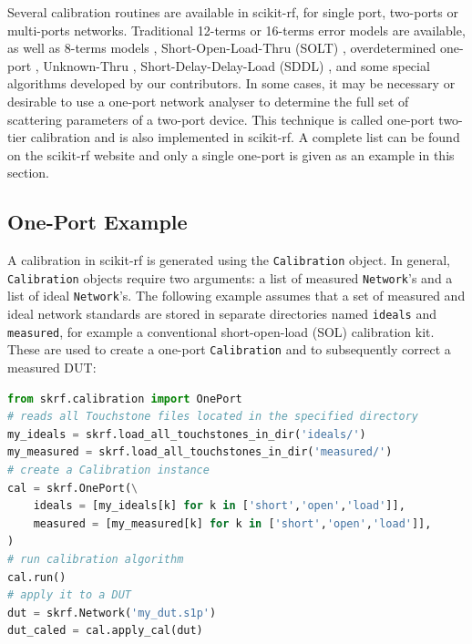\documentclass[10pt, letterpaper]{scrartcl}
\newcommand{\skrf}{{s}cikit-rf\xspace}
\begin{document}
Several calibration routines are available in \skrf{}, for single port, two-ports or multi-ports networks. Traditional 12-terms \cite{marks1997} or 16-terms \cite{silvonen1993} error models are available, as well as 8-terms models \cite{speciale1977}, Short-Open-Load-Thru (SOLT) \cite{kruppa1971}, overdetermined one-port \cite{bauer1974}, Unknown-Thru \cite{ferrero1992}, Short-Delay-Delay-Load (SDDL) \cite{liu2006}, and some special algorithms developed by our contributors. In some cases, it may be necessary or desirable to use a one-port network analyser to determine the full set of scattering parameters of a two-port device. This technique is called one-port two-tier calibration \cite{ou2005} and is also implemented in \skrf{}. A complete list can be found on the \skrf{} website and only a single one-port is given as an example in this section.

\subsection{One-Port Example}
A calibration in \skrf{} is generated using the \texttt{Calibration} object. In general, \texttt{Calibration} objects require two arguments: a list of measured \texttt{Network}’s and a list of ideal \texttt{Network}’s. The following example assumes that a set of measured and ideal network standards are stored in separate directories named \texttt{ideals} and \texttt{measured}, for example a conventional short-open-load (SOL) calibration kit. These are used to create a one-port \texttt{Calibration} and to subsequently correct a measured DUT:

\begin{lstlisting}[language=Python]
from skrf.calibration import OnePort
# reads all Touchstone files located in the specified directory
my_ideals = skrf.load_all_touchstones_in_dir('ideals/')
my_measured = skrf.load_all_touchstones_in_dir('measured/')
# create a Calibration instance
cal = skrf.OnePort(\
    ideals = [my_ideals[k] for k in ['short','open','load']],
    measured = [my_measured[k] for k in ['short','open','load']],
)
# run calibration algorithm
cal.run()
# apply it to a DUT
dut = skrf.Network('my_dut.s1p')
dut_caled = cal.apply_cal(dut)
\end{lstlisting}
\end{document}
